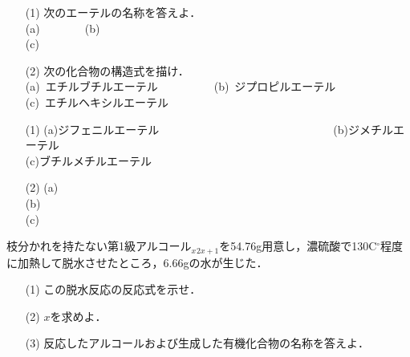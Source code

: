\documentclass[a4paper,12pt]{ltjsreport}
\begin{document}
  \newpage
        \begin{que}
        \begin{itemize}
            \item [(1)]次のエーテルの名称を答えよ．\\
            
            \noindent(a)~~~~~~~~(b)~\\[5pt]
            (c)~\\
            \item [(2)]次の化合物の構造式を描け．\\
            (a)~エチルブチルエーテル~~~~~~~~~~(b)~ジプロピルエーテル~~\\
            (c)~エチルヘキシルエーテル
        \end{itemize}
        \end{que}
        \ans
        \begin{itemize}
            \item [(1)](a)ジフェニルエーテル~~~~~~~~~~~~~~~~~~~~~~~~~~~~~~~(b)ジメチルエーテル~~~~~~~~~~~~~~~~~\\[15pt]
            (c)ブチルメチルエーテル\\[10pt]
            \item[(2)](a)\\[70pt]
            (b)\\[70pt]

            (c)
        \end{itemize}
        \newpage
        \begin{que}
        枝分かれを持たない第1級アルコール$_{x}$$_{2x+1}$を54.76g用意し，濃硫酸で130C$^\circ$程度に加熱して脱水させたところ，$6.66$gの水が生じた．
      \begin{itemize}
        \item [(1)]この脱水反応の反応式を示せ．
        \item [(2)]$x$を求めよ．
        \item [(3)]反応したアルコールおよび生成した有機化合物の名称を答えよ．
      \end{itemize}
        \end{que}
        \ans
\end{document}
